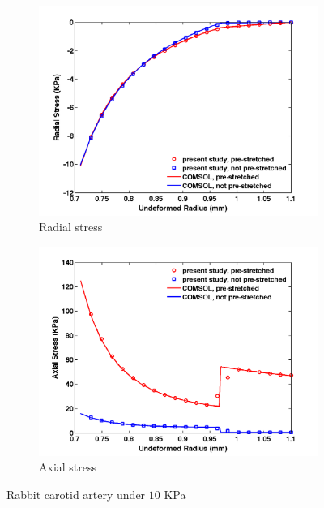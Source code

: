 \begin{figure}[H]
	\begin{subfigure}[b]{0.5\textwidth}
		\centering
		\includegraphics[width=\textwidth]{./figures/artery_radial.png}
		\caption{Radial stress}
		\label{radial_artery}
	\end{subfigure}
	\begin{subfigure}[b]{0.5\textwidth}
		\centering
		\includegraphics[width=\textwidth]{./figures/artery_axial.png}
		\caption{Axial stress}
		\label{axial_artery}
	\end{subfigure}
	\caption{Rabbit carotid artery under $10$ KPa}
	\label{fig:artery}
\end{figure}


















